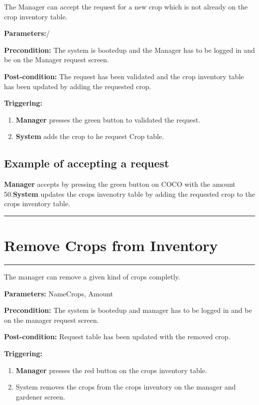The Manager can accept the request for a new crop which is not already on the
crop inventory table.
\begin{description}
\item \textbf{Parameters:}/
\item \textbf{Precondition:} The system is bootedup and the Manager has to be
logged in and be on the Manager request screen.
\item \textbf{Post-condition:} The request has been validated and the crop
inventory table has been updated by adding the requested crop.
\item \textbf{Triggering:}
\begin{enumerate}
\item \textbf{Manager} presses the green button to validated the request.
\item \textbf{System} adds the crop to he request Crop table.

\end{enumerate}
\end{description}

\subsection{Example of accepting a request}
\textbf{Manager} accepts by pressing the green button on COCO with the amount
50.\textbf{System} updates the crops invenotry table by adding the requested
crop to the crops inventory table.
\hfill
\vspace{0.5cm}
\hrule
 
\break
\section{Remove Crops from Inventory}

\hrule
\hfill
\vspace{0.5cm}

\label{operation:RemoveCrops}

The manager can remove a given kind of crops completly.
\begin{description}

\item \textbf{Parameters:} NameCrops, Amount
\item \textbf{Precondition:} The system is bootedup and manager has to be
logged in and be on the manager request screen.
\item \textbf{Post-condition:} Request table has been updated with the removed
crop.

\item \textbf{Triggering:}
\begin{enumerate}
\item \textbf{Manager} presses the red button on the crops inventory table.
\item System removes the crops from the crops inventory on the manager and
gardener screen.
\end{enumerate}
\end{description}

